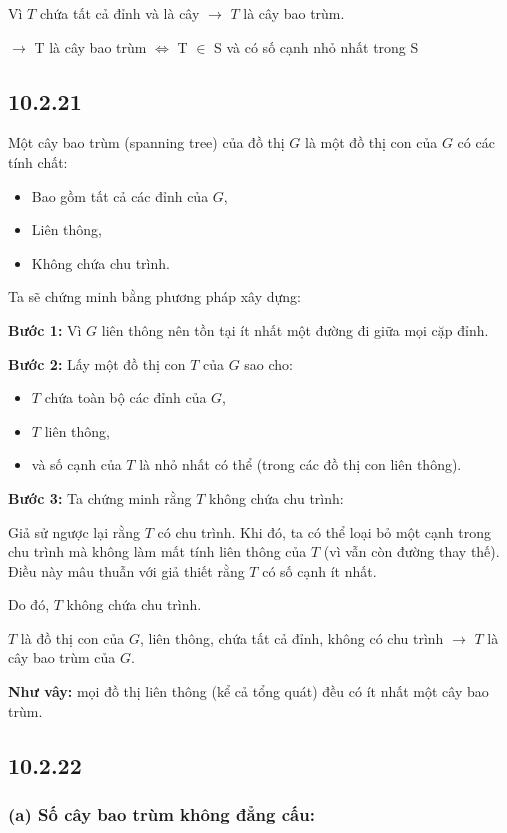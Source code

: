 \documentclass{article}
\begin{document}
	Vì $T$ chứa tất cả đỉnh và là cây $\rightarrow$ $T$ là cây bao trùm.
	
	$\rightarrow$ T là cây bao trùm $\Leftrightarrow$ T $\in$ S và có số cạnh nhỏ nhất trong S
	
	\subsection*{10.2.21}
	Một cây bao trùm (spanning tree) của đồ thị $G$ là một đồ thị con của $G$ có các tính chất:
	\begin{itemize}
		\item Bao gồm tất cả các đỉnh của $G$,
		\item Liên thông,
		\item Không chứa chu trình.
	\end{itemize}
	
	Ta sẽ chứng minh bằng phương pháp xây dựng:
	
	\textbf{Bước 1:} Vì $G$ liên thông nên tồn tại ít nhất một đường đi giữa mọi cặp đỉnh.
	
	\textbf{Bước 2:} Lấy một đồ thị con $T$ của $G$ sao cho:
	\begin{itemize}
		\item $T$ chứa toàn bộ các đỉnh của $G$,
		\item $T$ liên thông,
		\item và số cạnh của $T$ là nhỏ nhất có thể (trong các đồ thị con liên thông).
	\end{itemize}
	
	\textbf{Bước 3:} Ta chứng minh rằng $T$ không chứa chu trình:
	
	Giả sử ngược lại rằng $T$ có chu trình. Khi đó, ta có thể loại bỏ một cạnh trong chu trình mà không làm mất tính liên thông của $T$ (vì vẫn còn đường thay thế). Điều này mâu thuẫn với giả thiết rằng $T$ có số cạnh ít nhất.
	
	Do đó, $T$ không chứa chu trình.
	
	$T$ là đồ thị con của $G$, liên thông, chứa tất cả đỉnh, không có chu trình $\rightarrow$ $T$ là cây bao trùm của $G$.
	
	\textbf{Như vây:} mọi đồ thị liên thông (kể cả tổng quát) đều có ít nhất một cây bao trùm.
	
	\subsection*{10.2.22}
	\subsubsection*{(a) Số cây bao trùm không đẳng cấu:}
	
\end{document}

